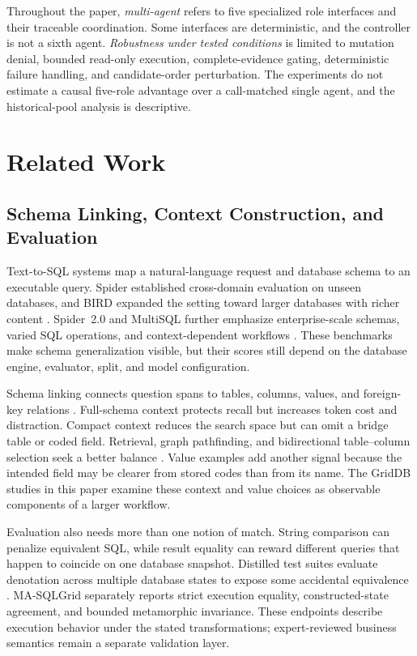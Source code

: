 \documentclass[applsci,article,submit,moreauthors]{Definitions/mdpi}
\newcommand{\masql}{MA-SQLGrid}
\begin{document}
Throughout the paper, \emph{multi-agent} refers to five specialized role interfaces and their traceable coordination. Some interfaces are deterministic, and the controller is not a sixth agent. \emph{Robustness under tested conditions} is limited to mutation denial, bounded read-only execution, complete-evidence gating, deterministic failure handling, and candidate-order perturbation. The experiments do not estimate a causal five-role advantage over a call-matched single agent, and the historical-pool analysis is descriptive.

\section{Related Work}

\subsection{Schema Linking, Context Construction, and Evaluation}

Text-to-SQL systems map a natural-language request and database schema to an executable query. Spider established cross-domain evaluation on unseen databases, and BIRD expanded the setting toward larger databases with richer content \cite{yu2018spider,li2023bird}. Spider~2.0 and MultiSQL further emphasize enterprise-scale schemas, varied SQL operations, and context-dependent workflows \cite{lei2025spider2,li2024multisql}. These benchmarks make schema generalization visible, but their scores still depend on the database engine, evaluator, split, and model configuration.

Schema linking connects question spans to tables, columns, values, and foreign-key relations \cite{wang2020ratsql,lei2020reexamining,liu2022semantic}. Full-schema context protects recall but increases token cost and distraction. Compact context reduces the search space but can omit a bridge table or coded field. Retrieval, graph pathfinding, and bidirectional table--column selection seek a better balance \cite{bozdemir2026schema,liu2025solidsql,hao2025genlink,wang2025linkalign,safdarian2026schemagraphsql,nahid2026bidirectional}. Value examples add another signal because the intended field may be clearer from stored codes than from its name. The GridDB studies in this paper examine these context and value choices as observable components of a larger workflow.

Evaluation also needs more than one notion of match. String comparison can penalize equivalent SQL, while result equality can reward different queries that happen to coincide on one database snapshot. Distilled test suites evaluate denotation across multiple database states to expose some accidental equivalence \cite{zhong2020semantic}. \masql{} separately reports strict execution equality, constructed-state agreement, and bounded metamorphic invariance. These endpoints describe execution behavior under the stated transformations; expert-reviewed business semantics remain a separate validation layer.
\end{document}
